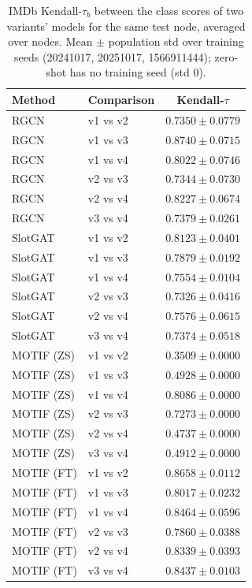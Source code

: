 \begin{table}[t]
\centering
\small
\begin{tabular}{||l||l||c||}
\hline
\textbf{Method} & \textbf{Comparison} & \textbf{Kendall-$\tau$} \\
\hline\hline
RGCN & v1 vs v2 & $0.7350 \pm 0.0779$ \\
\hline
RGCN & v1 vs v3 & $0.8740 \pm 0.0715$ \\
\hline
RGCN & v1 vs v4 & $0.8022 \pm 0.0746$ \\
\hline
RGCN & v2 vs v3 & $0.7344 \pm 0.0730$ \\
\hline
RGCN & v2 vs v4 & $0.8227 \pm 0.0674$ \\
\hline
RGCN & v3 vs v4 & $0.7379 \pm 0.0261$ \\
\hline
\hline
SlotGAT & v1 vs v2 & $0.8123 \pm 0.0401$ \\
\hline
SlotGAT & v1 vs v3 & $0.7879 \pm 0.0192$ \\
\hline
SlotGAT & v1 vs v4 & $0.7554 \pm 0.0104$ \\
\hline
SlotGAT & v2 vs v3 & $0.7326 \pm 0.0416$ \\
\hline
SlotGAT & v2 vs v4 & $0.7576 \pm 0.0615$ \\
\hline
SlotGAT & v3 vs v4 & $0.7374 \pm 0.0518$ \\
\hline
\hline
MOTIF (ZS) & v1 vs v2 & $0.3509 \pm 0.0000$ \\
\hline
MOTIF (ZS) & v1 vs v3 & $0.4928 \pm 0.0000$ \\
\hline
MOTIF (ZS) & v1 vs v4 & $0.8086 \pm 0.0000$ \\
\hline
MOTIF (ZS) & v2 vs v3 & $0.7273 \pm 0.0000$ \\
\hline
MOTIF (ZS) & v2 vs v4 & $0.4737 \pm 0.0000$ \\
\hline
MOTIF (ZS) & v3 vs v4 & $0.4912 \pm 0.0000$ \\
\hline
\hline
MOTIF (FT) & v1 vs v2 & $0.8658 \pm 0.0112$ \\
\hline
MOTIF (FT) & v1 vs v3 & $0.8017 \pm 0.0232$ \\
\hline
MOTIF (FT) & v1 vs v4 & $0.8464 \pm 0.0596$ \\
\hline
MOTIF (FT) & v2 vs v3 & $0.7860 \pm 0.0388$ \\
\hline
MOTIF (FT) & v2 vs v4 & $0.8339 \pm 0.0393$ \\
\hline
MOTIF (FT) & v3 vs v4 & $0.8437 \pm 0.0103$ \\
\hline
\end{tabular}
\caption{IMDb Kendall-$\tau_b$ between the class scores of two variants' models for the same test node, averaged over nodes. Mean $\pm$ population std over training seeds (20241017, 20251017, 1566911444); zero-shot has no training seed (std 0). }
\label{tab:nc_imdb_seed_invariance}
\end{table}
